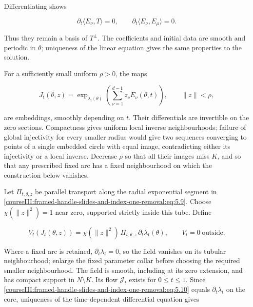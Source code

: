 Differentiating shows

\begin{equation}
\partial_t\langle E_\nu,T\rangle=0,\qquad
 \partial_t\langle E_\nu,E_\mu\rangle=0.
 \label{courseIII:framed-handle-slides-and-index-one-removal:eq:5.8}
\end{equation}

Thus they remain a basis of \(T^\perp\). The coefficients and initial data are smooth and periodic in \(\theta\); uniqueness of the linear equation gives the same properties to the solution.

For a sufficiently small uniform \(\rho>0\), the maps

\begin{equation}
J_t(\theta,z)=
  \exp_{\lambda_t(\theta)}
       \left(\sum_{\nu=1}^{d-1}z_\nu E_\nu(\theta,t)\right),
 \qquad \|z\|<\rho,
 \label{courseIII:framed-handle-slides-and-index-one-removal:eq:5.9}
\end{equation}

are embeddings, smoothly depending on \(t\). Their differentials are invertible on the zero sections. Compactness gives uniform local inverse neighbourhoods; failure of global injectivity for every smaller radius would give two sequences converging to points of a single embedded circle with equal image, contradicting either its injectivity or a local inverse. Decrease \(\rho\) so that all their images miss \(K\), and so that any prescribed fixed arc has a fixed neighbourhood on which the construction below vanishes.

Let \(\Pi_{t,\theta,z}\) be parallel transport along the radial exponential segment in \eqref{courseIII:framed-handle-slides-and-index-one-removal:eq:5.9}. Choose \(\chi(\|z\|^2)=1\) near zero, supported strictly inside this tube. Define

\begin{equation}
V_t(J_t(\theta,z))
   =\chi(\|z\|^2)\,
      \Pi_{t,\theta,z}\,\partial_t\lambda_t(\theta),
 \qquad V_t=0\ \text{outside}.
 \label{courseIII:framed-handle-slides-and-index-one-removal:eq:5.10}
\end{equation}

Where a fixed arc is retained, \(\partial_t\lambda_t=0\), so the field vanishes on its tubular neighbourhood; enlarge the fixed parameter collar before choosing the required smaller neighbourhood. The field is smooth, including at its zero extension, and has compact support in \(N\setminus K\). Its flow \(\mathcal J_t\) exists for \(0\leq t\leq1\). Since \eqref{courseIII:framed-handle-slides-and-index-one-removal:eq:5.10} equals \(\partial_t\lambda_t\) on the core, uniqueness of the time-dependent differential equation gives

